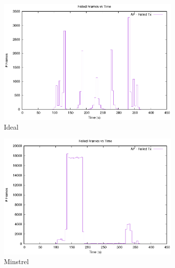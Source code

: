 \documentclass[12]{article}
\begin{document}
\begin{figure}[!htb]
\begin{subfigure}{.5\textwidth}
  \centering
  \includegraphics[width=\linewidth]{"20Mhz_Long_1SS_0AU/Ideal/FailedPackets"}
  \caption{Ideal}
  \label{fig:20_id_fpt}
\end{subfigure}%
\begin{subfigure}{.5\textwidth}
  \includegraphics[width=\linewidth]{"20Mhz_Long_1SS_0AU/MinstrelHt/FailedPackets"}
  \caption{Minstrel}
  \label{fig:20_mi_fpt}
\end{subfigure}%
\\
\hspace*{-1.5cm}
\begin{subfigure}{.4\textwidth}
  \centering

\end{subfigure}
\end{figure}
\end{document}
